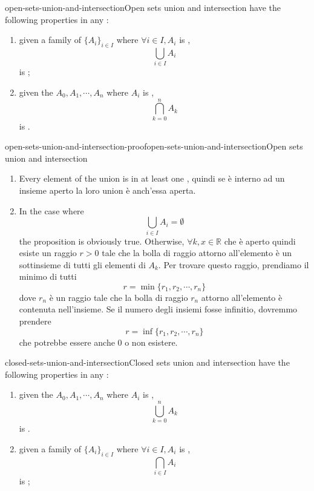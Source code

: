 \documentclass[preview]{standalone}
\begin{document}
\begin{snippetproposition}{open-sets-union-and-intersection}{Open sets union and intersection}
     have the following properties in any \metricspace:
    \begin{enumerate}
        \item given a family of \set[sets] \({\{A_i\}}_{i\in I}\) where \(\forall i \in I, A_i\)
        is \msopenset[open],
        \[
            \bigcup_{i \in I} A_i
        \]
        is \msopenset[open];
        \item given the  \set[sets] \(A_0, A_1, \cdots, A_n\) where \(A_i\)
        is \msopenset[open],
        \[
            \bigcap_{k=0}^n A_k
        \]
        is \msopenset[open].
    \end{enumerate}
\end{snippetproposition}

\begin{snippetproof}{open-sets-union-and-intersection-proof}{open-sets-union-and-intersection}{Open sets union and intersection}
    \begin{enumerate}
        \item Every element of the union is in at least one \msopenset, quindi se è interno
        ad un insieme aperto la loro union è anch'essa aperta.
        \item In the case where
        \[
            \bigcup_{i \in I} A_i = \emptyset
        \]
        the proposition is obviously true.
        Otherwise, \(\forall k, x \in \mathbb{R}\) che è aperto quindi
        esiste un raggio \(r > 0\) tale che la bolla di raggio attorno all'elemento è un sottinsieme di
        tutti gli elementi di \(A_k\). Per trovare questo raggio, prendiamo il minimo di tutti
        \[
            r = \min\{ r_1, r_2, \cdots, r_n \}
        \]
        dove \(r_n\) è un raggio tale che la bolla di raggio \(r_n\) attorno all'elemento
        è contenuta nell'insieme.
        Se il numero degli insiemi fosse infinitio, dovremmo prendere
        \[
            r = \inf\{ r_1, r_2, \cdots, r_n \}
        \]
        che potrebbe essere anche \(0\) o non esistere.
    \end{enumerate}
\end{snippetproof}

\begin{snippetproposition}{closed-sets-union-and-intersection}{Closed sets union and intersection}
     have the following properties in any \metricspace:
    \begin{enumerate}
        \item given the \set[sets] \(A_0, A_1, \cdots, A_n\) where \(A_i\)
        is \msclosedset[closed],
        \[
            \bigcup_{k=0}^n A_k
        \]
        is \msclosedset[closed].
        \item given a family of \set[sets] \({\{A_i\}}_{i\in I}\) where \(\forall i \in I, A_i\)
        is \msclosedset[closed],
        \[
            \bigcap_{i \in I} A_i
        \]
        is \msclosedset[closed];
    \end{enumerate}
\end{snippetproposition}
\end{document}
